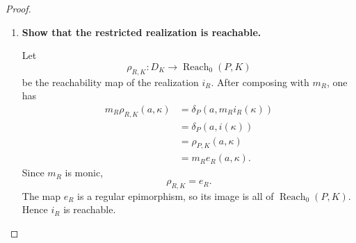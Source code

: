 \begin{proof}
\begin{enumerate}
        Define
        \[
            i_R:=e_R\iota_K.
        \]
        Since
        \[
            m_Re_R=\rho_{P,K},
        \]
        the Mealy unit law gives
        \[
            \begin{aligned}
                m_Ri_R
                &=
                m_Re_R\iota_K
                \\
                &=
                \rho_{P,K}\iota_K
                \\
                &=
                i.
            \end{aligned}
        \]

        The composite
        \[
            \beta_Pm_R:
            \operatorname{Reach}_0(P,K)\to\mathbf{Beh}_0
        \]
        is a strict semantic homomorphism. By terminality of the canonical
        behaviour machine,
        \[
            \beta_{\operatorname{Reach}}
            =
            \beta_Pm_R.
        \]
        Therefore
        \[
            \begin{aligned}
                \beta_{\operatorname{Reach}}i_R
                &=
                \beta_Pm_Re_R\iota_K
                \\
                &=
                \beta_P\rho_{P,K}\iota_K
                \\
                &=
                d_K\iota_K
                \\
                &=
                k.
            \end{aligned}
        \]
        Thus \(i_R\) is a realization of \(k\).

        \item \textbf{Show that the restricted realization is reachable.}

        Let
        \[
            \rho_{R,K}:
            D_K\to\operatorname{Reach}_0(P,K)
        \]
        be the reachability map of the realization \(i_R\). After composing
        with \(m_R\), one has
        \[
            \begin{aligned}
                m_R\rho_{R,K}(a,\kappa)
                &=
                \delta_P(a,m_Ri_R(\kappa))
                \\
                &=
                \delta_P(a,i(\kappa))
                \\
                &=
                \rho_{P,K}(a,\kappa)
                \\
                &=
                m_Re_R(a,\kappa).
            \end{aligned}
        \]
        Since \(m_R\) is monic,
        \[
            \rho_{R,K}=e_R.
        \]
        The map \(e_R\) is a regular epimorphism, so its image is all of
        \(\operatorname{Reach}_0(P,K)\). Hence \(i_R\) is reachable.


\end{enumerate}
\end{proof}
